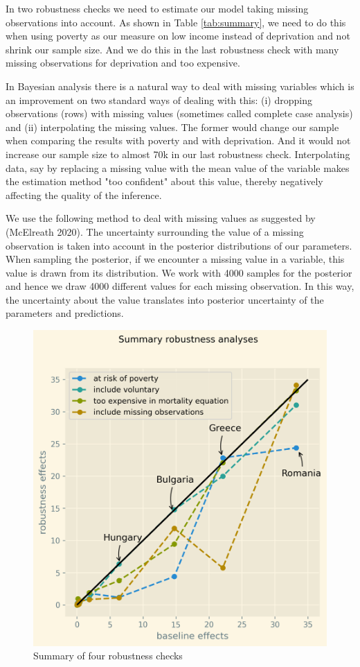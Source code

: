 \documentclass[a4paper,12pt]{article}
\makeatletter
\newcommand{\citeprocitem}[2]{\hyper@linkstart{cite}{citeproc_bib_item_#1}#2\hyper@linkend}
\makeatother
\begin{document}
In two robustness checks we need to estimate our model taking missing observations into account. As shown in Table \ref{tab:summary}, we need to do this when using poverty as our measure on low income instead of deprivation and not shrink our sample size. And we do this in the last robustness check with many missing observations for deprivation and too expensive.

In Bayesian analysis there is a natural way to deal with missing variables which is an improvement on two standard ways of dealing with this: (i) dropping observations (rows) with missing values (sometimes called complete case analysis) and (ii) interpolating the missing values. The former would change our sample when comparing the results with poverty and with deprivation. And it would not increase our sample size to almost 70k in our last robustness check. Interpolating data, say by replacing a missing value with the mean value of the variable makes the estimation method "too confident" about this value, thereby negatively affecting the quality of the inference.

We use the following method to deal with missing values as suggested by (\citeprocitem{18}{McElreath 2020}). The uncertainty surrounding the value of a missing observation is taken into account in the posterior distributions of our parameters. When sampling the posterior, if we encounter a missing value in a variable, this value is drawn from its distribution. We work with 4000 samples for the posterior and hence we draw 4000 different values for each missing observation. In this way, the uncertainty about the value translates into posterior uncertainty of the parameters and predictions.


\begin{figure}[htbp]
\centering
\includegraphics[width=.9\linewidth]{./figures/robustness_summary.png}
\caption{\label{fig:robustness_summary}Summary of four robustness checks}
\end{figure}
\end{document}
